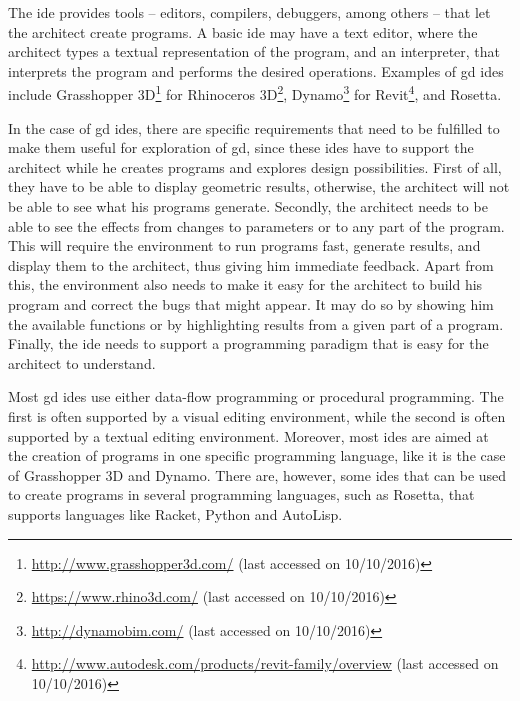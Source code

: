 The \gls{ide} provides tools -- editors, compilers, debuggers, among others -- that let the architect create programs.
A basic \gls{ide} may have a text editor, where the architect types a textual representation of the program, and an interpreter, that interprets the program and performs the desired operations.
Examples of \gls{gd} \glspl{ide} include Grasshopper 3D\footnote{\url{http://www.grasshopper3d.com/} (last accessed on 10/10/2016)} for Rhinoceros 3D\footnote{\url{https://www.rhino3d.com/} (last accessed on 10/10/2016)}, Dynamo\footnote{\url{http://dynamobim.com/} (last accessed on 10/10/2016)} for Revit\footnote{\url{http://www.autodesk.com/products/revit-family/overview} (last accessed on 10/10/2016)}, and Rosetta\cite{de2012modern}.

In the case of \gls{gd} \glspl{ide}, there are specific requirements that need to be fulfilled to make them useful for exploration of \gls{gd}, since these \glspl{ide} have to support the architect while he creates programs and explores design possibilities.
First of all, they have to be able to display geometric results, otherwise, the architect will not be able to see what his programs generate.
Secondly, the architect needs to be able to see the effects from changes to parameters or to any part of the program.
This will require the environment to run programs fast, generate results, and display them to the architect, thus giving him immediate feedback.
Apart from this, the environment also needs to make it easy for the architect to build his program and correct the bugs that might appear.
It may do so by showing him the available functions or by highlighting results from a given part of a program.
Finally, the \gls{ide} needs to support a programming paradigm that is easy for the architect to understand.

Most \gls{gd} \glspl{ide} use either data-flow programming or procedural programming.
The first is often supported by a visual editing environment, while the second is often supported by a textual editing environment.
Moreover, most \glspl{ide} are aimed at the creation of programs in one specific programming language, like it is the case of Grasshopper 3D and Dynamo.
There are, however, some \glspl{ide} that can be used to create programs in several programming languages, such as Rosetta, that supports languages like Racket\cite{flatt2016racket}, Python\cite{rossum2003python} and AutoLisp.


